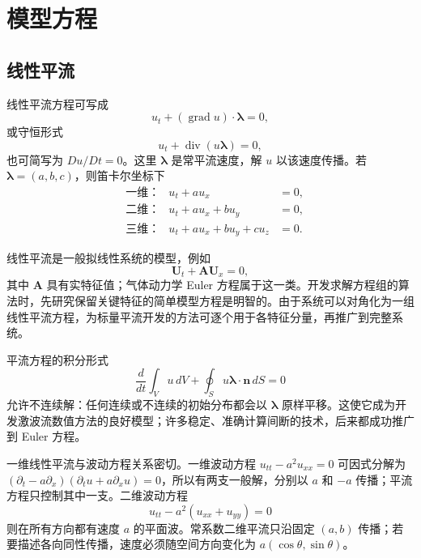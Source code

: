 \documentclass[11pt,a4paper,openany,fontset=none]{ctexbook}
\begin{document}
\chapter{模型方程}

\section{线性平流}

线性平流方程可写成
\begin{equation}
 u_t+(\operatorname{grad}u)\cdot\bm\lambda=0, \tag{2.1.1}
\end{equation}
或守恒形式
\begin{equation}
 u_t+\operatorname{div}(u\bm\lambda)=0, \tag{2.1.2}
\end{equation}
也可简写为 $Du/Dt=0$。这里 $\bm\lambda$ 是常平流速度，解 $u$ 以该速度传播。若 $\bm\lambda=(a,b,c)$，则笛卡尔坐标下
\begin{align}
 &\text{一维：}&u_t+a u_x&=0, \tag{2.1.4}\\
 &\text{二维：}&u_t+a u_x+b u_y&=0, \tag{2.1.5}\\
 &\text{三维：}&u_t+a u_x+b u_y+c u_z&=0. \tag{2.1.6}
\end{align}

线性平流是一般拟线性系统的模型，例如
\begin{equation}
 \bm U_t+\bm A\bm U_x=0, \tag{2.1.7}
\end{equation}
其中 $\bm A$ 具有实特征值；气体动力学 Euler 方程属于这一类。开发求解方程组的算法时，先研究保留关键特征的简单模型方程是明智的。由于系统可以对角化为一组线性平流方程，为标量平流开发的方法可逐个用于各特征分量，再推广到完整系统。

平流方程的积分形式
\begin{equation}
 \frac{d}{dt}\int_Vu\,dV+\oint_Su\bm\lambda\cdot\bm n\,dS=0 \tag{2.1.8}
\end{equation}
允许不连续解：任何连续或不连续的初始分布都会以 $\bm\lambda$ 原样平移。这使它成为开发激波流数值方法的良好模型；许多稳定、准确计算间断的技术，后来都成功推广到 Euler 方程。

一维线性平流与波动方程关系密切。一维波动方程 $u_{tt}-a^2u_{xx}=0$ 可因式分解为 $(\partial_t-a\partial_x)(\partial_tu+a\partial_xu)=0$，所以有两支一般解，分别以 $a$ 和 $-a$ 传播；平流方程只控制其中一支。二维波动方程
\begin{equation}u_{tt}-a^2(u_{xx}+u_{yy})=0 \tag{2.1.11}\end{equation}
则在所有方向都有速度 $a$ 的平面波。常系数二维平流只沿固定 $(a,b)$ 传播；若要描述各向同性传播，速度必须随空间方向变化为 $a(\cos\theta,\sin\theta)$。
\end{document}
